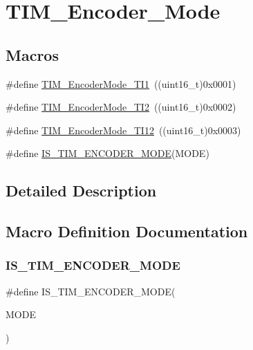 \hypertarget{group___t_i_m___encoder___mode}{}\section{T\+I\+M\+\_\+\+Encoder\+\_\+\+Mode}
\label{group___t_i_m___encoder___mode}
\subsection*{Macros}
\begin{DoxyCompactItemize}
\item 
\#define \mbox{\hyperlink{group___t_i_m___encoder___mode_gabc63e3617a938382f87439ec58768b8e}{T\+I\+M\+\_\+\+Encoder\+Mode\+\_\+\+T\+I1}}~((uint16\+\_\+t)0x0001)
\item 
\#define \mbox{\hyperlink{group___t_i_m___encoder___mode_ga5627a2d5d47b7301c7dbb29d20ae00e3}{T\+I\+M\+\_\+\+Encoder\+Mode\+\_\+\+T\+I2}}~((uint16\+\_\+t)0x0002)
\item 
\#define \mbox{\hyperlink{group___t_i_m___encoder___mode_ga12511f903de08f1a634ff7828757f081}{T\+I\+M\+\_\+\+Encoder\+Mode\+\_\+\+T\+I12}}~((uint16\+\_\+t)0x0003)
\item 
\#define \mbox{\hyperlink{group___t_i_m___encoder___mode_ga9dd5baa6b2a44e0f25068a650cbfdd1b}{I\+S\+\_\+\+T\+I\+M\+\_\+\+E\+N\+C\+O\+D\+E\+R\+\_\+\+M\+O\+DE}}(M\+O\+DE)
\end{DoxyCompactItemize}


\subsection{Detailed Description}


\subsection{Macro Definition Documentation}
\mbox{\label{group___t_i_m___encoder___mode_ga9dd5baa6b2a44e0f25068a650cbfdd1b}} 
\subsubsection{\texorpdfstring{IS\_TIM\_ENCODER\_MODE}{IS\_TIM\_ENCODER\_MODE}}
{\footnotesize\ttfamily \#define I\+S\+\_\+\+T\+I\+M\+\_\+\+E\+N\+C\+O\+D\+E\+R\+\_\+\+M\+O\+DE(\begin{DoxyParamCaption}\item[{}]{M\+O\+DE }\end{DoxyParamCaption})}

